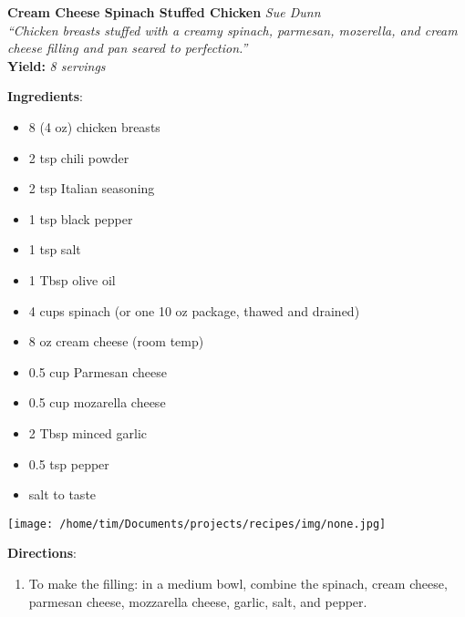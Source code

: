 \documentclass[11pt, twoside, openany]{book}
\begin{document}
\noindent\begin{minipage}[t]{\linewidth}%
{\Large\textbf{Cream Cheese Spinach Stuffed Chicken}} \label{cream-cheese-spinach-stuffed-chicken}\hfill\textit{Sue Dunn}\\
\textit{``Chicken breasts stuffed with a creamy spinach, parmesan, mozerella, and cream cheese filling and pan seared to perfection.''}\\
\textbf{Yield:} \textit{8 servings}\\
\noindent\begin{minipage}[t]{0.78\linewidth}%
\textbf{Ingredients}:\vspace{-3mm}
\begin{multicols}{2}
\begin{itemize}\setlength\itemsep{-1mm}
\item 8 (4 oz) chicken breasts
\item 2 tsp chili powder
\item 2 tsp Italian seasoning
\item 1 tsp black pepper
\item 1 tsp salt
\item 1 Tbsp olive oil
\item 4 cups spinach (or one 10 oz package, thawed and drained)
\item 8 oz cream cheese (room temp)
\item 0.5 cup Parmesan cheese
\item 0.5 cup mozarella cheese
\item 2 Tbsp minced garlic
\item 0.5 tsp pepper
\item salt to taste
\end{itemize}
\end{multicols}
\end{minipage}
\noindent\begin{minipage}[t]{0.18\linewidth}
\centering \strut\vspace*{-\baselineskip}\newline
\texttt{[image: /home/tim/Documents/projects/recipes/img/none.jpg]}\\
\end{minipage}\vspace{3mm}
\textbf{Directions}:
\vspace{-3mm}\begin{enumerate}\setlength\itemsep{-1mm}
\item To make the filling: in a medium bowl, combine the spinach, cream cheese, parmesan cheese, mozzarella cheese, garlic, salt, and pepper.

\end{enumerate}
\end{minipage}
\end{document}

